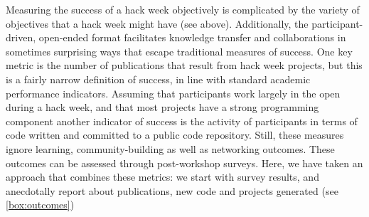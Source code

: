 Measuring the success of a hack week objectively is complicated by the variety of objectives that a hack week might have (see above).
Additionally, the participant-driven, open-ended format facilitates knowledge transfer and collaborations in sometimes surprising ways that escape traditional measures of success.
One key metric is the number of publications that result from hack week projects, but this is a fairly narrow definition of success, in line with standard academic performance indicators.
Assuming that participants work largely in the open during a hack week, and that most projects have a strong programming component another indicator of success is the activity of participants in terms of code written and committed to a public code repository.
Still, these measures ignore learning, community-building as well as networking outcomes.
These outcomes can be assessed through post-workshop surveys.
Here, we have taken an approach that combines these metrics: we start with survey results, and anecdotally report about publications, new code and projects generated (see \ref{box:outcomes})


